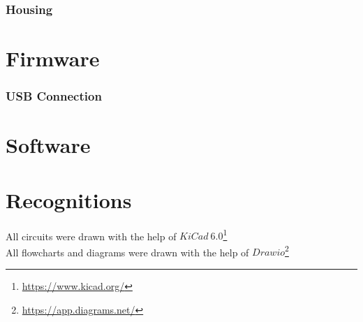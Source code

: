 \pagebreak

\subsubsection{Housing}


\section{Firmware}
\label{Firmware}

\subsubsection{USB Connection}
\label{USB Connection}


\section{Software}
\label{Software}

\pagebreak

\section{Recognitions}
\label{Recognitions}
All circuits were drawn with the help of $KiCad\ 6.0$\footnote{\url{https://www.kicad.org/}}\\

\noindent All flowcharts and diagrams were drawn with the help of $Drawio$\footnote{\url{https://app.diagrams.net/}}




